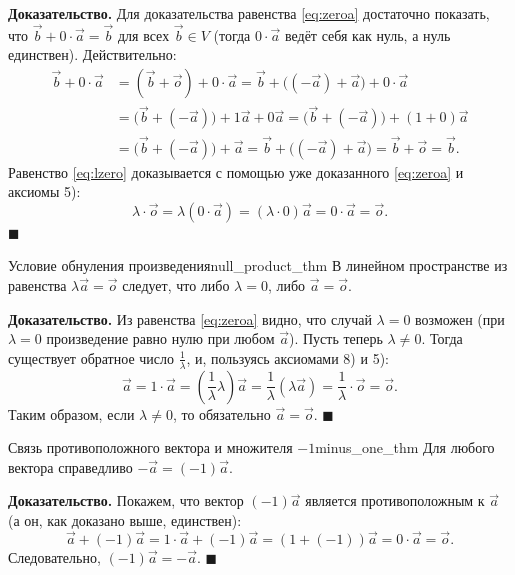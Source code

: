 \documentclass[12pt,a4paper]{article}
\newenvironment{myproof}{\noindent\textbf{Доказательство.}}{\hfill$\blacksquare$}
\begin{document}
\begin{myproof}
Для доказательства равенства \eqref{eq:zeroa} достаточно показать, что
$\vec{b} + 0 \cdot \vec{a} = \vec{b}$ для всех $\vec{b} \in V$ (тогда
$0\cdot\vec{a}$ ведёт себя как нуль, а нуль единствен). Действительно:
\begin{align*}
\vec{b} + 0 \cdot \vec{a}
&= (\vec{b} + \vec{o}) + 0 \cdot \vec{a}
= \vec{b} + \big((-\vec{a}) + \vec{a}\big) + 0 \cdot \vec{a} \\
&= \big(\vec{b} + (-\vec{a})\big) + 1\vec{a} + 0\vec{a}
= \big(\vec{b} + (-\vec{a})\big) + (1 + 0)\vec{a} \\
&= \big(\vec{b} + (-\vec{a})\big) + \vec{a}
= \vec{b} + \big((-\vec{a}) + \vec{a}\big)
= \vec{b} + \vec{o} = \vec{b}.
\end{align*}
Равенство \eqref{eq:lzero} доказывается с помощью уже доказанного
\eqref{eq:zeroa} и аксиомы 5):
\[
\lambda \cdot \vec{o} = \lambda(0 \cdot \vec{a})
= (\lambda \cdot 0)\vec{a} = 0 \cdot \vec{a} = \vec{o}.
\]
\end{myproof}

\begin{theorem}{Условие обнуления произведения}{null_product_thm}
В линейном пространстве из равенства $\lambda\vec{a} = \vec{o}$
следует, что либо $\lambda = 0$, либо $\vec{a} = \vec{o}$.
\end{theorem}

\begin{myproof}
Из равенства \eqref{eq:zeroa} видно, что случай $\lambda = 0$
возможен (при $\lambda = 0$ произведение равно нулю при любом
$\vec{a}$). Пусть теперь $\lambda \neq 0$. Тогда существует обратное
число $\tfrac{1}{\lambda}$, и, пользуясь аксиомами 8) и 5):
\[
\vec{a} = 1 \cdot \vec{a}
= \left(\frac{1}{\lambda}\lambda\right)\vec{a}
= \frac{1}{\lambda}(\lambda\vec{a})
= \frac{1}{\lambda} \cdot \vec{o} = \vec{o}.
\]
Таким образом, если $\lambda \neq 0$, то обязательно $\vec{a} = \vec{o}$.
\end{myproof}

\begin{theorem}{Связь противоположного вектора и множителя $-1$}{minus_one_thm}
Для любого вектора справедливо $-\vec{a} = (-1)\vec{a}$.
\end{theorem}

\begin{myproof}
Покажем, что вектор $(-1)\vec{a}$ является противоположным к
$\vec{a}$ (а он, как доказано выше, единствен):
\[
\vec{a} + (-1)\vec{a} = 1 \cdot \vec{a} + (-1)\vec{a}
= (1 + (-1))\vec{a} = 0 \cdot \vec{a} = \vec{o}.
\]
Следовательно, $(-1)\vec{a} = -\vec{a}$.
\end{myproof}
\end{document}
